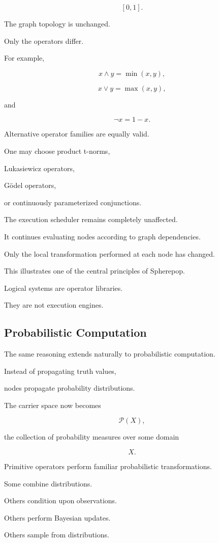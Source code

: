 \documentclass[12pt,oneside]{article}
\begin{document}
\[
[0,1].
\]

The graph topology is unchanged.

Only the operators differ.

For example,

\[
x\land y
=
\min(x,y),
\]

\[
x\lor y
=
\max(x,y),
\]

and

\[
\lnot x
=
1-x.
\]

Alternative operator families are equally valid.

One may choose product t-norms,

Lukasiewicz operators,

Gödel operators,

or continuously parameterized conjunctions.

The execution scheduler remains completely unaffected.

It continues evaluating nodes according to graph dependencies.

Only the local transformation performed at each node has changed.

This illustrates one of the central principles of Spherepop.

Logical systems are operator libraries.

They are not execution engines.

\subsection{Probabilistic Computation}

The same reasoning extends naturally to probabilistic computation.

Instead of propagating truth values,

nodes propagate probability distributions.

The carrier space now becomes

\[
\mathcal P(X),
\]

the collection of probability measures over some domain

\[
X.
\]

Primitive operators perform familiar probabilistic transformations.

Some combine distributions.

Others condition upon observations.

Others perform Bayesian updates.

Others sample from distributions.
\end{document}
